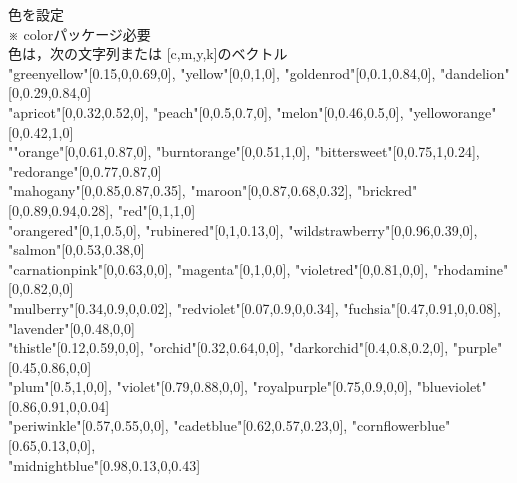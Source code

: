 \documentclass[a4j]{ujarticle}
\newcommand{\tab}[2][12zw]{%
\noindent
\hspace*{2zw}\Ltab{#1 }{#2}%
}
\newcommand{\chuu}[1][15zw]{%
\Ltab{#1}{}※ %
}
\begin{document}
\tab{Setcolor(色 \{, 濃さ\})}色を設定\\
\chuu colorパッケージ必要\\
\hspace*{2zw} 色は，次の文字列または [c,m,y,k]のベクトル\\
\hspace*{2.5zw}"greenyellow"[0.15,0,0.69,0],
"yellow"[0,0,1,0],
"goldenrod"[0,0.1,0.84,0],
"dandelion"[0,0.29,0.84,0]\\
\hspace*{2.5zw}"apricot"[0,0.32,0.52,0],
"peach"[0,0.5,0.7,0],
"melon"[0,0.46,0.5,0],
"yelloworange"[0,0.42,1,0]\\
\hspace*{2.5zw}""orange"[0,0.61,0.87,0],
"burntorange"[0,0.51,1,0],
"bittersweet"[0,0.75,1,0.24],\\
\hspace*{2.5zw}"redorange"[0,0.77,0.87,0]\\
\hspace*{2.5zw}"mahogany"[0,0.85,0.87,0.35],
"maroon"[0,0.87,0.68,0.32],
"brickred"[0,0.89,0.94,0.28],
"red"[0,1,1,0]\\
\hspace*{2.5zw}"orangered"[0,1,0.5,0],
"rubinered"[0,1,0.13,0],
"wildstrawberry"[0,0.96,0.39,0],\\
\hspace*{2.5zw}"salmon"[0,0.53,0.38,0]\\
\hspace*{2.5zw}"carnationpink"[0,0.63,0,0],
"magenta"[0,1,0,0],
"violetred"[0,0.81,0,0],
"rhodamine"[0,0.82,0,0]\\
\hspace*{2.5zw}"mulberry"[0.34,0.9,0,0.02],
"redviolet"[0.07,0.9,0,0.34],
"fuchsia"[0.47,0.91,0,0.08],\\
\hspace*{2.5zw}"lavender"[0,0.48,0,0]\\
\hspace*{2.5zw}"thistle"[0.12,0.59,0,0],
"orchid"[0.32,0.64,0,0],
"darkorchid"[0.4,0.8,0.2,0],
"purple"[0.45,0.86,0,0]\\
\hspace*{2.5zw}"plum"[0.5,1,0,0],
"violet"[0.79,0.88,0,0],
"royalpurple"[0.75,0.9,0,0],
"blueviolet"[0.86,0.91,0,0.04]\\
\hspace*{2.5zw}"periwinkle"[0.57,0.55,0,0],
"cadetblue"[0.62,0.57,0.23,0],
"cornflowerblue"[0.65,0.13,0,0],\\
\hspace*{2.5zw}"midnightblue"[0.98,0.13,0,0.43]\\
\end{document}
